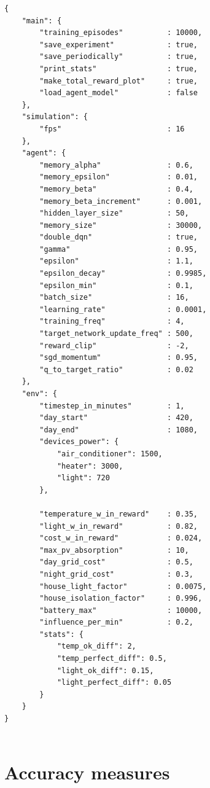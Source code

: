 \documentclass{article}
\begin{document}
\begin{lstlisting}
{
    "main": {
        "training_episodes"          : 10000,
        "save_experiment"            : true,
        "save_periodically"          : true,
        "print_stats"                : true,
        "make_total_reward_plot"     : true,
        "load_agent_model"           : false
    },
    "simulation": {
        "fps"                        : 16
    },
    "agent": {
        "memory_alpha"               : 0.6,
        "memory_epsilon"             : 0.01,
        "memory_beta"                : 0.4,
        "memory_beta_increment"      : 0.001,
        "hidden_layer_size"          : 50,
        "memory_size"                : 30000,
        "double_dqn"                 : true,
        "gamma"                      : 0.95,
        "epsilon"                    : 1.1,
        "epsilon_decay"              : 0.9985,
        "epsilon_min"                : 0.1,
        "batch_size"                 : 16,
        "learning_rate"              : 0.0001,
        "training_freq"              : 4,
        "target_network_update_freq" : 500,
        "reward_clip"                : -2,
        "sgd_momentum"               : 0.95,
        "q_to_target_ratio"          : 0.02
    },
    "env": {
        "timestep_in_minutes"        : 1,
        "day_start"                  : 420,
        "day_end"                    : 1080,
        "devices_power": {
            "air_conditioner": 1500,
            "heater": 3000,
            "light": 720
        },

        "temperature_w_in_reward"    : 0.35,
        "light_w_in_reward"          : 0.82,
        "cost_w_in_reward"           : 0.024,
        "max_pv_absorption"          : 10,
        "day_grid_cost"              : 0.5,
        "night_grid_cost"            : 0.3,
        "house_light_factor"         : 0.0075,
        "house_isolation_factor"     : 0.996,
        "battery_max"                : 10000,
        "influence_per_min"          : 0.2,
        "stats": {
            "temp_ok_diff": 2,
            "temp_perfect_diff": 0.5,
            "light_ok_diff": 0.15,
            "light_perfect_diff": 0.05
        }
    }
}


\end{lstlisting}

\section{Accuracy measures}
\end{document}
